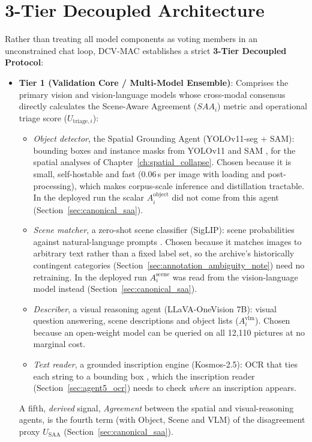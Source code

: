 \documentclass[12pt,a4paper]{report}
\begin{document}
\section{3-Tier Decoupled Architecture}
\label{sec:tiers}
Rather than treating all model components as voting members in an unconstrained chat loop, DCV-MAC establishes a strict \textbf{3-Tier Decoupled Protocol}:

\begin{itemize}
    \item \textbf{Tier 1 (Validation Core / Multi-Model Ensemble)}: Comprises the primary vision and vision-language models whose cross-modal consensus directly calculates the Scene-Aware Agreement ($SAA_i$) metric and operational triage score ($U_{\text{triage}, i}$):
    \begin{itemize}
        \item \textit{Object detector}, the Spatial Grounding Agent (YOLOv11-seg + SAM): bounding boxes and instance masks from YOLOv11 \cite{yolov11_2024} and SAM \cite{sam2023}, for the spatial analyses of Chapter~\ref{ch:spatial_collapse}. Chosen because it is small, self-hostable and fast ($0.06$\,s per image with loading and post-processing), which makes corpus-scale inference and distillation tractable. In the deployed run the scalar $A_i^{\text{object}}$ did not come from this agent (Section~\ref{sec:canonical_saa}).
        \item \textit{Scene matcher}, a zero-shot scene classifier (SigLIP): scene probabilities against natural-language prompts \cite{siglip2023}. Chosen because it matches images to arbitrary text rather than a fixed label set, so the archive's historically contingent categories (Section~\ref{sec:annotation_ambiguity_note}) need no retraining. In the deployed run $A_i^{\text{scene}}$ was read from the vision-language model instead (Section~\ref{sec:canonical_saa}).
        \item \textit{Describer}, a visual reasoning agent (LLaVA-OneVision 7B): visual question answering, scene descriptions and object lists \cite{llava_onevision2024} ($A_i^{\text{vlm}}$). Chosen because an open-weight model can be queried on all 12,110 pictures at no marginal cost.
        \item \textit{Text reader}, a grounded inscription engine (Kosmos-2.5): OCR that ties each string to a bounding box \cite{kosmos2_5_2024}, which the inscription reader (Section~\ref{sec:agent5_ocr}) needs to check \emph{where} an inscription appears.
    \end{itemize}
    A fifth, \emph{derived} signal, \textit{Agreement} between the spatial and visual-reasoning agents, is the fourth term (with Object, Scene and VLM) of the disagreement proxy $U_{\text{SAA}}$ (Section~\ref{sec:canonical_saa}).


\end{itemize}
\end{document}
